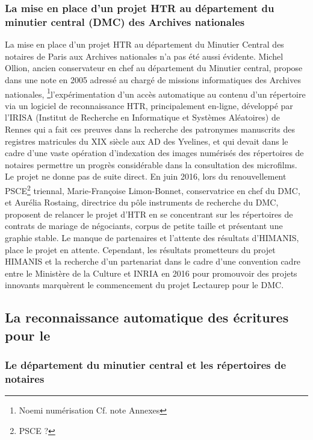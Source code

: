 \subsubsection{La mise en place d'un projet HTR au département du minutier central (DMC) des Archives nationales}

La mise en place d'un projet HTR au département du Minutier Central des notaires de Paris aux Archives nationales n'a pas été aussi évidente. Michel Ollion, ancien conservateur en chef au département du Minutier central, propose dans une note en 2005 adressé au chargé de missions informatiques des Archives nationales, \footnote{Noemi numérisation Cf. note Annexes}l'expérimentation d'un accès automatique au contenu d'un répertoire via un logiciel de reconnaissance HTR, principalement en-ligne, développé par l'IRISA (Institut de Recherche en Informatique et Systèmes Aléatoires) de Rennes qui a fait ces preuves dans la recherche des patronymes manuscrits des registres matricules du XIX siècle aux AD des Yvelines, et qui devait dans le cadre d'une vaste opération d'indexation des images numérisés des répertoires de notaires permettre un progrès considérable dans la consultation des microfilms. Le projet ne donne pas de suite direct. En juin 2016, lors du renouvellement PSCE\footnote{PSCE ?} triennal, Marie-Françoise Limon-Bonnet, conservatrice en chef du DMC, et Aurélia Rostaing, directrice du pôle instruments de recherche du DMC, proposent de relancer le projet d'HTR en se concentrant sur les répertoires de contrats de mariage de négociants, corpus de petite taille et présentant une graphie stable. Le manque de partenaires et l'attente des résultats d'HIMANIS, place le projet en attente. Cependant, les résultats prometteurs du projet HIMANIS et la recherche d'un partenariat dans le cadre d'une convention cadre entre le Ministère de la Culture et INRIA en 2016 pour promouvoir des projets innovants marquèrent le commencement du projet Lectaurep pour le DMC. 


\subsection{La reconnaissance automatique des écritures pour le }

\subsubsection{Le département du minutier central et les répertoires de notaires}

